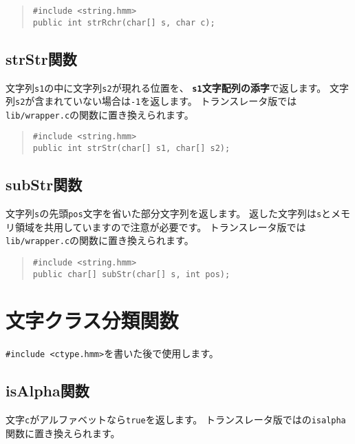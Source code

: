 \begin{quote}
\begin{verbatim}
#include <string.hmm>
public int strRchr(char[] s, char c);
\end{verbatim}
\end{quote}

\subsection{strStr関数}

文字列\verb/s1/の中に文字列\verb/s2/が現れる位置を、
{\bf\verb/s1/文字配列の添字}で返します。
文字列\verb/s2/が含まれていない場合は\verb/-1/を返します。
トランスレータ版では\verb;lib/wrapper.c;の関数に置き換えられます。

\begin{quote}
\begin{verbatim}
#include <string.hmm>
public int strStr(char[] s1, char[] s2);
\end{verbatim}
\end{quote}

\subsection{subStr関数}

文字列\verb/s/の先頭\verb/pos/文字を省いた部分文字列を返します。
返した文字列は\verb/s/とメモリ領域を共用していますので注意が必要です。
トランスレータ版では\verb;lib/wrapper.c;の関数に置き換えられます。

\begin{quote}
\begin{verbatim}
#include <string.hmm>
public char[] subStr(char[] s, int pos);
\end{verbatim}
\end{quote}

\section{文字クラス分類関数}

\verb/#include <ctype.hmm>/を書いた後で使用します。

\subsection{isAlpha関数}

文字\verb/c/がアルファベットなら\verb/true/を返します。
トランスレータ版では\cl の\verb/isalpha/関数に置き換えられます。

